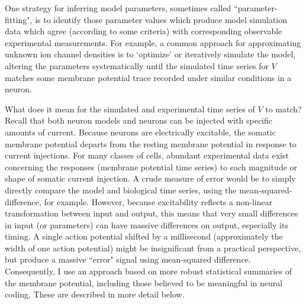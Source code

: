 
One strategy for inferring model parameters, sometimes called ``parameter-fitting", is to identify those parameter values which produce model simulation data which agree (according to some criteria) with corresponding observable experimental measurements.
For example, a common approach for approximating unknown ion channel densities is to ‘optimize’ or iteratively simulate the model, altering the parameters systematically until the simulated time series for $V$ matches some membrane potential trace recorded under similar conditions in a neuron.

What does it mean for the simulated and experimental time series of $V$ to match?
Recall that both neuron models and neurons can be injected with specific amounts of current. Because neurons are electrically excitable, the somatic membrane potential departs from the resting membrane potential in response to current injections.
For many classes of cells, abundant experimental data exist concerning the responses (membrane potential time series) to each magnitude or shape of somatic current injection.
A crude measure of error would be to simply directly compare the model and biological time series, using the mean-squared-difference, for example.
However, because excitability reflects a non-linear transformation between input and output, this means that very small differences in input (or parameters) can have massive differences on output, especially its timing.
A single action potential shifted by a millisecond (approximately the width of one action potential) might be insignificant from a practical perspective, but produce a massive ``error" signal using mean-squared difference.
Consequently, I use an approach based on more robust statistical summaries of the membrane potential, including those believed to be meaningful in neural coding.
These are described in more detail below.

